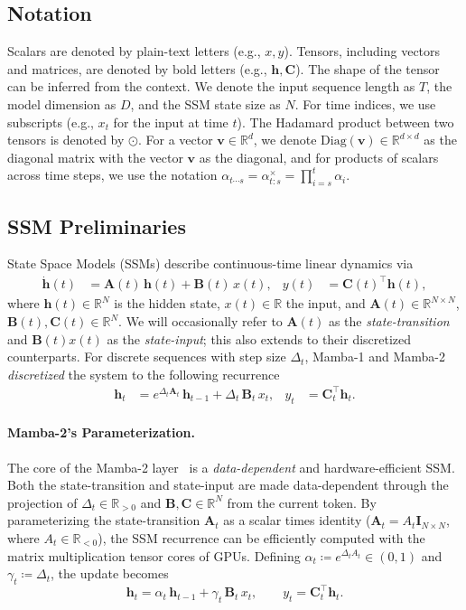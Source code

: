 \documentclass{article}
\newcommand{\citep}{\parencite}
\def\vh{{\bm{h}}}
\def\vv{{\bm{v}}}
\def\bA{{\bm{A}}}
\def\bB{{\bm{B}}}
\def\bC{{\bm{C}}}
\theoremstyle{plain}
\theoremstyle{definition}
\theoremstyle{remark}
\begin{document}
\subsection{Notation}
Scalars are denoted by plain-text letters (e.g., $x, y$). 
Tensors, including vectors and matrices, are denoted by bold letters (e.g., $\vh, \bC$). 
The shape of the tensor can be inferred from the context.
We denote the input sequence length as $T$, the model dimension as $D$, and the SSM state size as $N$. 
For time indices, we use subscripts (e.g., $x_t$ for the input at time $t$).
The Hadamard product between two tensors is denoted by $\odot$.
For a vector $\vv \in \mathbb{R}^d$, we denote $\mathrm{Diag}(\vv) \in \mathbb{R}^{d \times d}$ as the diagonal matrix with the vector $\vv$ as the diagonal, and for products of scalars across time steps, we use the notation $\alpha_{t \cdots s} = \alpha^\times_{t:s} = \prod_{i=s}^{t} \alpha_i$.

\subsection{SSM Preliminaries}

State Space Models (SSMs) describe continuous-time linear dynamics via
\begin{align*}
\dot{\vh}(t) &= \bA(t)\,\vh(t) + \bB(t)\,x(t), &
y(t) &= \bC(t)^\top \vh(t),
\end{align*}
where $\vh(t)\!\in\!\mathbb{R}^N$ is the hidden state, $x(t)\!\in\!\mathbb{R}$ the input, and $\bA(t)\!\in\!\mathbb{R}^{N\times N}$, $\bB(t),\bC(t)\!\in\!\mathbb{R}^N$.
We will occasionally refer to $\bA(t)$ as the \emph{state-transition} and $\bB(t)x(t)$ as the \emph{state-input}; this also extends to their discretized counterparts. 
For discrete sequences with step size $\Delta_t$,
Mamba-1 and Mamba-2 \emph{discretized} the system to the following recurrence
\begin{align*}
\vh_t &= e^{\Delta_t \bA_t}\,\vh_{t-1} + \Delta_t\,\bB_t\,x_t, &
y_t &= \bC_t^\top \vh_t .
\end{align*}

\paragraph{Mamba-2's Parameterization.}
The core of the Mamba-2 layer~\citep{dao2024transformersssmsgeneralizedmodels} is a \emph{data-dependent} and hardware-efficient SSM.
Both the state-transition and state-input are made data-dependent through the projection of $\Delta_t \in \mathbb{R}_{>0}$ and $\bB, \bC\in\mathbb{R}^N$ from the current token.
By parameterizing the state-transition $\bA_t$ as a scalar times identity ($\bA_t = A_t \bm{I}_{N\times N}$, where 
$A_t \in \mathbb{R}_{<0}$), the SSM recurrence can be efficiently computed with the matrix multiplication tensor cores of GPUs.
Defining $\alpha_t \coloneqq e^{\Delta_t A_t}\in(0,1)$ and $\gamma_t \coloneqq \Delta_t$, the update becomes
\begin{equation}
\label{eq:mamba2-recurrence-prelim}
\vh_t = \alpha_t\,\vh_{t-1} + \gamma_t\,\bB_t\,x_t, \qquad
y_t = \bC_t^\top \vh_t .
\end{equation}
\end{document}

